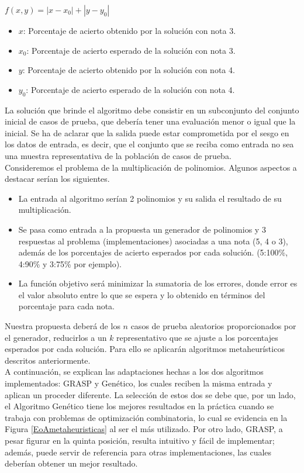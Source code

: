 \documentclass[a4paper,openright,11pt,oneside]{book}
\begin{document}
	$f(x,y) = |x - x_0| + |y - y_0|$ \label{fo}
	
	\begin{itemize}
		\item $x$: Porcentaje de acierto obtenido por la solución con nota 3.
		\item $x_0$: Porcentaje de acierto esperado de la solución con nota 3.
		\item $y$: Porcentaje de acierto obtenido por la solución con nota 4.
		\item $y_0$: Porcentaje de acierto esperado de la solución con nota 4.
	\end{itemize}

	La solución que brinde el algoritmo debe consistir en un subconjunto del conjunto inicial de casos de prueba, que debería tener una evaluación menor o igual que la inicial. Se ha de aclarar que la salida puede estar comprometida por el sesgo en los datos de entrada, es decir, que el conjunto que se reciba como entrada no sea una muestra representativa de la población de casos de prueba. \\
	
	Consideremos el problema de la multiplicación de polinomios. Algunos aspectos a destacar serían los siguientes.
	\begin{itemize}
		\item La entrada al algoritmo serían 2 polinomios y su salida el resultado de su multiplicación.
		\item Se pasa como entrada a la propuesta un generador de polinomios y 3 respuestas al problema (implementaciones) asociadas a una nota (5, 4 o 3), además de los porcentajes de acierto esperados por cada solución. (5:100\%, 4:90\% y 3:75\% por ejemplo).
		\item La función objetivo será minimizar la sumatoria de los errores, donde error es el valor absoluto entre lo que se espera y lo obtenido en términos del porcentaje para cada nota.
	\end{itemize}

	Nuestra propuesta deberá de los $n$ casos de prueba aleatorios proporcionados por el generador, reducirlos a un $k$ representativo que se ajuste a los porcentajes esperados por cada solución. Para ello se aplicarán algoritmos metaheurísticos descritos anteriormente. \\
	
	A continuación, se explican las adaptaciones hechas a los dos algoritmos implementados: GRASP y Genético, los cuales reciben la misma entrada y aplican un proceder diferente. La selección de estos dos se debe que, por un lado, el Algoritmo Genético tiene los mejores resultados en la práctica cuando se trabaja con problemas de optimización combinatoria, lo cual se evidencia en la Figura \ref{EoAmetaheuristicas} al ser el más utilizado. Por otro lado, GRASP, a pesar figurar en la quinta posición, resulta intuitivo y fácil de implementar; además, puede servir de referencia para otras implementaciones, las cuales deberían obtener un mejor resultado.
	
\end{document}

